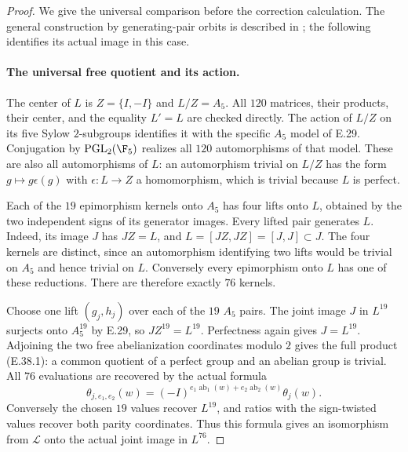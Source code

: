\begin{proof}
We give the universal comparison before the correction
calculation.  The general construction by generating-pair
orbits is described in \cite[\S2.1, Lemma 2.1]{DE_Guillot2015};
the following identifies its actual image in this case.

\paragraph{The universal free quotient and its action.}
The center of $L$ is $Z=\{I,-I\}$ and $L/Z=A_5$.
All $120$ matrices, their products, their center, and the
equality $L'=L$ are checked directly.  The action of $L/Z$
on its five Sylow $2$-subgroups identifies it with the
specific $A_5$ model of E.29.  Conjugation by
$\operatorname{PGL}_2(\F_5)$ realizes all $120$
automorphisms of that model.  These are also all
automorphisms of $L$: an automorphism trivial on $L/Z$
has the form $g\mapsto g\epsilon(g)$ with
$\epsilon:L\to Z$ a homomorphism, which is trivial
because $L$ is perfect.

Each of the $19$ epimorphism kernels onto $A_5$ has
four lifts onto $L$, obtained by the two independent
signs of its generator images.  Every lifted pair
generates $L$.  Indeed, its image $J$ has $JZ=L$,
and $L=[JZ,JZ]=[J,J]\subset J$.
The four kernels are distinct, since an automorphism
identifying two lifts would be trivial on $A_5$ and
hence trivial on $L$.  Conversely every epimorphism
onto $L$ has one of these reductions.  There are
therefore exactly $76$ kernels.

Choose one lift $(g_j,h_j)$ over each of the $19$
$A_5$ pairs.  The joint image $J$ in $L^{19}$
surjects onto $A_5^{19}$ by E.29, so
$JZ^{19}=L^{19}$.  Perfectness again gives
$J=L^{19}$.  Adjoining the two free abelianization
coordinates modulo $2$ gives the full product
\textup{(E.38.1)}: a common quotient of a perfect
group and an abelian group is trivial.  All $76$
evaluations are recovered by the actual formula
\[
 \theta_{j,e_1,e_2}(w)
   =(-I)^{e_1\operatorname{ab}_1(w)+
               e_2\operatorname{ab}_2(w)}\theta_j(w).
 \tag{E.38.3}
\]
Conversely the chosen $19$ values recover $L^{19}$,
and ratios with the sign-twisted values recover
both parity coordinates.  Thus this formula gives
an isomorphism from $\mathcal L$ onto the actual
joint image in $L^{76}$.


\end{proof}
